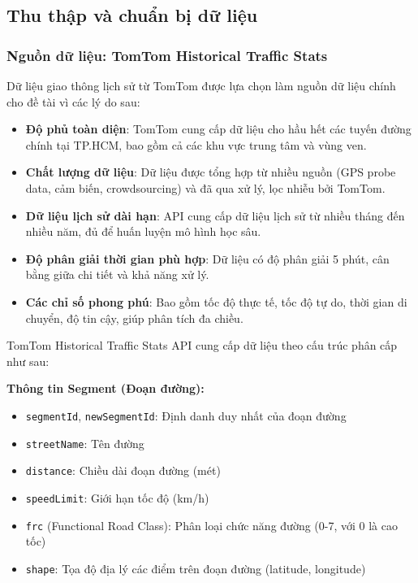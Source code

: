
\subsection{Thu thập và chuẩn bị dữ liệu}

\subsubsection{Nguồn dữ liệu: TomTom Historical Traffic Stats}


Dữ liệu giao thông lịch sử từ TomTom được lựa chọn làm nguồn dữ liệu chính cho đề tài vì các lý do sau:

\begin{itemize}
    \item \textbf{Độ phủ toàn diện}: TomTom cung cấp dữ liệu cho hầu hết các tuyến đường chính tại TP.HCM, bao gồm cả các khu vực trung tâm và vùng ven.
    
    \item \textbf{Chất lượng dữ liệu}: Dữ liệu được tổng hợp từ nhiều nguồn (GPS probe data, cảm biến, crowdsourcing) và đã qua xử lý, lọc nhiễu bởi TomTom.
    
    \item \textbf{Dữ liệu lịch sử dài hạn}: API cung cấp dữ liệu lịch sử từ nhiều tháng đến nhiều năm, đủ để huấn luyện mô hình học sâu.
    
    \item \textbf{Độ phân giải thời gian phù hợp}: Dữ liệu có độ phân giải 5 phút, cân bằng giữa chi tiết và khả năng xử lý.
    
    \item \textbf{Các chỉ số phong phú}: Bao gồm tốc độ thực tế, tốc độ tự do, thời gian di chuyển, độ tin cậy, giúp phân tích đa chiều.
\end{itemize}


TomTom Historical Traffic Stats API cung cấp dữ liệu theo cấu trúc phân cấp như sau:

\textbf{Thông tin Segment (Đoạn đường):}
\begin{itemize}
    \item \texttt{segmentId}, \texttt{newSegmentId}: Định danh duy nhất của đoạn đường
    \item \texttt{streetName}: Tên đường
    \item \texttt{distance}: Chiều dài đoạn đường (mét)
    \item \texttt{speedLimit}: Giới hạn tốc độ (km/h)
    \item \texttt{frc} (Functional Road Class): Phân loại chức năng đường (0-7, với 0 là cao tốc)
    \item \texttt{shape}: Tọa độ địa lý các điểm trên đoạn đường (latitude, longitude)
\end{itemize}

